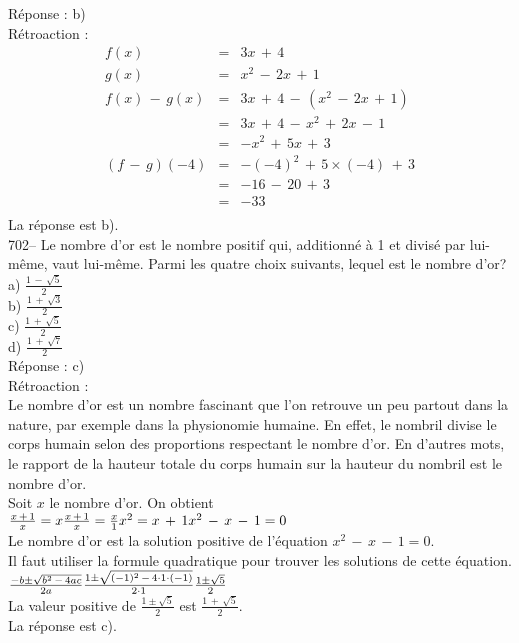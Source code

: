 ﻿\documentclass[letterpaper, 12pt]{article}
\begin{document}
R\'eponse : b)\\

R\'etroaction : \\
\begin{eqnarray*}
f(x)&=&3x\,+\,4\\
g(x)&=&x^{2}\,-\,2x\,+\,1\\
f(x)\,-\,g(x)&=&3x\,+\,4\,-\,(x^{2}\,-\,2x\,+\,1)\\
&=&3x\,+\,4\,-\,x^{2}\,+\,2x\,-\,1\\
&=&-x^{2}\,+\,5x\,+\,3\\
(f\,-\,g)(-4)&=& - (-4)^{2}\,+\,5\times(-4)\,+\,3\\
&=&-16\,-\,20\,+\,3\\
&=&-33\\
\end{eqnarray*}
La r\'eponse est b).\\

702-- Le nombre d'or est le nombre positif qui, additionn\'e \`a 1 et
divis\'e par lui-m\^eme, vaut lui-m\^eme.  Parmi les quatre choix suivants,
lequel est le nombre d'or?\\
a) $\frac{1\,-\,\sqrt{5}}{2}$\\
b) $\frac{1\,+\,\sqrt{3}}{2}$\\
c) $\frac{1\,+\,\sqrt{5}}{2}$\\
d) $\frac{1\,+\,\sqrt{7}}{2}$\\

R\'eponse : c)\\

R\'etroaction : \\
Le nombre d'or est un nombre fascinant que l'on retrouve un peu partout dans
la nature, par exemple dans la physionomie humaine. En effet, le nombril
divise le corps humain selon des proportions respectant le nombre d'or.  En
d'autres mots, le rapport de la hauteur totale du corps humain sur la
hauteur du nombril est le nombre d'or.\\
Soit $x$ le nombre d'or.  On obtient\\[2mm]
$\frac{x\,+\,1}{x}=x\\[2mm]
\frac{x\,+\,1}{x}=\frac{x}{1}\\[2mm]
x^{2}=x\,+\,1\\[2mm]
x^{2}\,-\,x\,-\,1=0$\\[2mm]
Le nombre d'or est la solution positive de l'\'equation
$x^{2}\,-\,x\,-\,1=0$.\\
Il faut utiliser la formule quadratique pour trouver les solutions de cette
\'equation.\\[2mm]
$\frac{-b\pm\sqrt{b^{2}\,-\,4ac}}{2a}\\[2mm]
\frac{1\pm\sqrt{(-1)^{2}\,-\,4\cdot1\cdot(-1)}}{2\cdot1}\\[2mm]
\frac{1\pm\sqrt{5}}{2}$\\[2mm]
La valeur positive de $\frac{1\pm\sqrt{5}}{2}$ est
$\frac{1\,+\,\sqrt{5}}{2}$.\\[2mm]
La r\'eponse est c).\\
\end{document}
